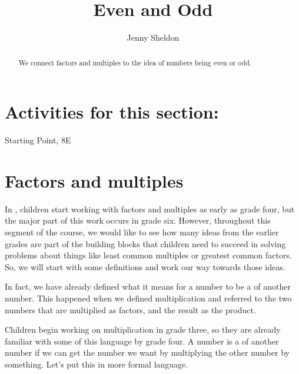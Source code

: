 \documentclass{ximera}
\title{Even and Odd}
\author{Jenny Sheldon}
\begin{document}
\begin{abstract}
We connect factors and multiples to the idea of numbers being even or odd.
\end{abstract}
\maketitle

\section{Activities for this section:} Starting Point, 8E

\section{Factors and multiples}

In , children start working with factors and multiples as early as grade four, but the major part of this work occurs in grade six. However, throughout this segment of the course, we would like to see how many ideas from the earlier grades are part of the building blocks that children need to succeed in solving problems about things like least common multiples or greatest common factors. So, we will start with some definitions and work our way towards those ideas. 

In fact, we have already defined what it means for a number to be a  of another number. This happened when we defined multiplication and referred to the two numbers that are multiplied as factors, and the result as the product.
\begin{image}
\end{image}
Children begin working on multiplication in grade three, so they are already familiar with some of this language by grade four. A number is a  of another number if we can get the number we want by multiplying the other number by something. Let's put this in more formal language.
\end{document}
